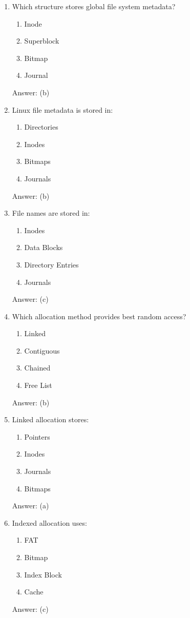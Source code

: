 \begin{enumerate}
\item Which structure stores global file system metadata?
\begin{enumerate}[label=(\alph*)]
\item Inode
\item Superblock
\item Bitmap
\item Journal
\end{enumerate}
Answer: (b)

\item Linux file metadata is stored in:
\begin{enumerate}[label=(\alph*)]
\item Directories
\item Inodes
\item Bitmaps
\item Journals
\end{enumerate}
Answer: (b)

\item File names are stored in:
\begin{enumerate}[label=(\alph*)]
\item Inodes
\item Data Blocks
\item Directory Entries
\item Journals
\end{enumerate}
Answer: (c)

\item Which allocation method provides best random access?
\begin{enumerate}[label=(\alph*)]
\item Linked
\item Contiguous
\item Chained
\item Free List
\end{enumerate}
Answer: (b)

\item Linked allocation stores:
\begin{enumerate}[label=(\alph*)]
\item Pointers
\item Inodes
\item Journals
\item Bitmaps
\end{enumerate}
Answer: (a)

\item Indexed allocation uses:
\begin{enumerate}[label=(\alph*)]
\item FAT
\item Bitmap
\item Index Block
\item Cache
\end{enumerate}
Answer: (c)


\end{enumerate}
